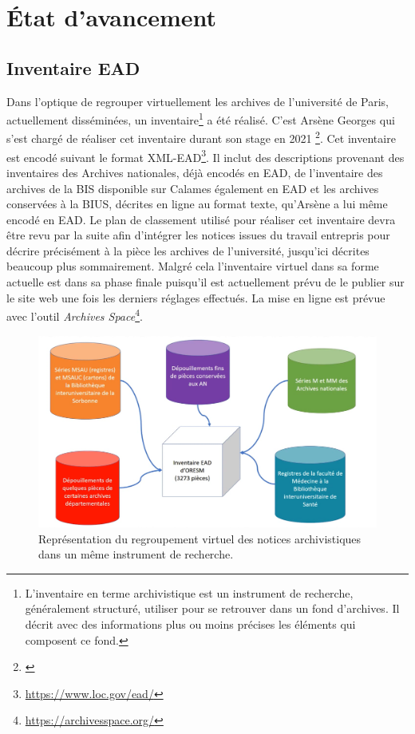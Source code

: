 \section{État d'avancement}
\subsection{Inventaire EAD}
Dans l'optique de regrouper virtuellement les archives de l'université de Paris, actuellement disséminées, un inventaire\footnote{L'inventaire en terme archivistique est un instrument de recherche, généralement structuré, utiliser pour se retrouver dans un fond d'archives. Il décrit avec des informations plus ou moins précises les éléments qui composent ce fond.} a été réalisé. C'est Arsène Georges qui s'est chargé de réaliser cet inventaire durant son stage en 2021 \footnote{\cite{georges_reunion_2021}}. Cet inventaire est encodé suivant le format XML-EAD\footnote{\href{https://www.loc.gov/ead/}{https://www.loc.gov/ead/}}. Il inclut des descriptions provenant des inventaires des Archives nationales, déjà encodés en EAD, de l'inventaire des archives de la BIS disponible sur Calames également en EAD et les archives conservées à la BIUS, décrites en ligne au format texte, qu'Arsène a lui même encodé en EAD. Le plan de classement utilisé pour réaliser cet inventaire devra être revu par la suite afin d'intégrer les notices issues du travail entrepris pour décrire précisément à la pièce les archives de l'université, jusqu'ici décrites beaucoup plus sommairement. Malgré cela l'inventaire virtuel dans sa forme actuelle est dans sa phase finale puisqu'il est actuellement prévu de le publier sur le site web une fois les derniers réglages effectués. La mise en ligne est prévue avec l'outil \textit{Archives Space}\footnote{\href{https://archivesspace.org/}{https://archivesspace.org/}}.
\begin{figure}[!h]
    \centering
    \includegraphics[width=0.8\linewidth]{images/Visualisation inventaire.png}
    \caption{Représentation du regroupement virtuel des notices archivistiques dans un même instrument de recherche.}
    \label{fig:visualisation-inventaire}
\end{figure}
